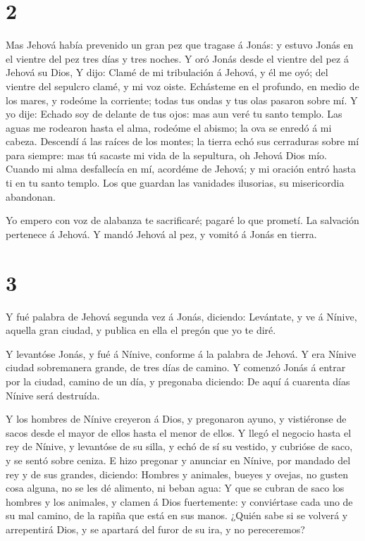 
\hypertarget{section-1}{%
\section{2}\label{section-1}}

 Mas Jehová había prevenido un gran pez que tragase á Jonás:
y estuvo Jonás en el vientre del pez tres días y tres noches.
 Y oró Jonás desde el vientre del pez á Jehová su Dios,
 Y dijo: Clamé de mi tribulación á Jehová, y él me oyó; del
vientre del sepulcro clamé, y mi voz oiste.  Echásteme en el
profundo, en medio de los mares, y rodeóme la corriente; todas tus ondas
y tus olas pasaron sobre mí.  Y yo dije: Echado soy de
delante de tus ojos: mas aun veré tu santo templo.  Las
aguas me rodearon hasta el alma, rodeóme el abismo; la ova se enredó á
mi cabeza.  Descendí á las raíces de los montes; la tierra
echó sus cerraduras sobre mí para siempre: mas tú sacaste mi vida de la
sepultura, oh Jehová Dios mío.  Cuando mi alma desfallecía
en mí, acordéme de Jehová; y mi oración entró hasta ti en tu santo
templo.  Los que guardan las vanidades ilusorias, su
misericordia abandonan.

 Yo empero con voz de alabanza te sacrificaré; pagaré lo
que prometí. La salvación pertenece á Jehová. Y mandó Jehová al pez, y
vomitó á Jonás en tierra.

\hypertarget{section-2}{%
\section{3}\label{section-2}}

 Y fué palabra de Jehová segunda vez á Jonás, diciendo:
 Levántate, y ve á Nínive, aquella gran ciudad, y publica en
ella el pregón que yo te diré.

 Y levantóse Jonás, y fué á Nínive, conforme á la palabra de
Jehová. Y era Nínive ciudad sobremanera grande, de tres días de camino.
 Y comenzó Jonás á entrar por la ciudad, camino de un día, y
pregonaba diciendo: De aquí á cuarenta días Nínive será destruída.

 Y los hombres de Nínive creyeron á Dios, y pregonaron
ayuno, y vistiéronse de sacos desde el mayor de ellos hasta el menor de
ellos.  Y llegó el negocio hasta el rey de Nínive, y
levantóse de su silla, y echó de sí su vestido, y cubrióse de saco, y se
sentó sobre ceniza.  E hizo pregonar y anunciar en Nínive,
por mandado del rey y de sus grandes, diciendo: Hombres y animales,
bueyes y ovejas, no gusten cosa alguna, no se les dé alimento, ni beban
agua:  Y que se cubran de saco los hombres y los animales, y
clamen á Dios fuertemente: y conviértase cada uno de su mal camino, de
la rapiña que está en sus manos.  ¿Quién sabe si se volverá
y arrepentirá Dios, y se apartará del furor de su ira, y no pereceremos?

